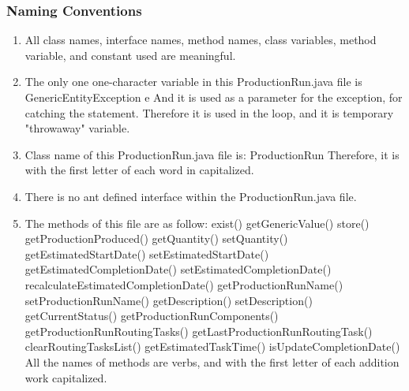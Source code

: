 \documentclass{article}
\begin{document}
  \subsubsection{Naming Conventions}
  \begin{enumerate}
  	\item
  	All class names, interface names, method names, class variables, method variable, and constant used are meaningful.
  	
  	\item
  	The only one one-character variable in this ProductionRun.java file is \newline
  	GenericEntityException e \newline
  	And it is used as a parameter for the exception, for catching the statement. Therefore it is used in the loop, and it is temporary "throwaway" variable.
  	
  	\item
  	Class name of this ProductionRun.java file is: \newline
  	ProductionRun\newline
  	Therefore, it is with the first letter of each word in capitalized.
  	
  	\item
  	There is no ant defined interface within the ProductionRun.java file.
  	
  	\item
  	The methods of this file are as follow:\newline
  	exist()\newline
  	getGenericValue()\newline
  	store()\newline
  	getProductionProduced()\newline
  	getQuantity()\newline
  	setQuantity()\newline
  	getEstimatedStartDate()\newline
  	setEstimatedStartDate()\newline
  	getEstimatedCompletionDate()\newline
  	setEstimatedCompletionDate()\newline
  	recalculateEstimatedCompletionDate()\newline
  	getProductionRunName()\newline
  	setProductionRunName()\newline
  	getDescription()\newline
  	setDescription()\newline
  	getCurrentStatus()\newline
  	getProductionRunComponents()\newline
  	getProductionRunRoutingTasks()\newline
  	getLastProductionRunRoutingTask()\newline
  	clearRoutingTasksList()\newline
  	getEstimatedTaskTime()\newline
  	isUpdateCompletionDate()\newline
  	All the names of methods are verbs, and with the first letter of each addition work capitalized.
  	

\end{enumerate}
\end{document}
